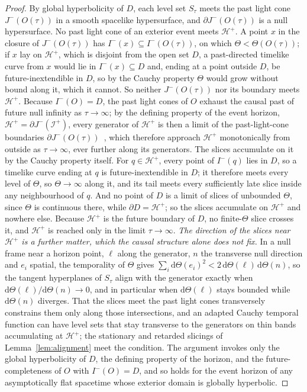 \documentclass[11pt,a4paper]{article}
\theoremstyle{plain}
\theoremstyle{remark}
\begin{document}
\begin{proof}
By global hyperbolicity of $D$, each level set $S_\tau$ meets the past light cone $J^-(O(\tau))$ in a smooth spacelike hypersurface, and $\partial J^-(O(\tau))$ is a null hypersurface. No past light cone of an exterior event meets $\mathcal{H}^+$. A point $x$ in the closure of $J^-(O(\tau))$ has $I^-(x)\subseteq I^-(O(\tau))$, on which $\Theta<\Theta(O(\tau))$; if $x$ lay on $\mathcal{H}^+$, which is disjoint from the open set $D$, a past-directed timelike curve from $x$ would lie in $I^-(x)\subseteq D$ and, ending at a point outside $D$, be future-inextendible in $D$, so by the Cauchy property $\Theta$ would grow without bound along it, which it cannot. So neither $J^-(O(\tau))$ nor its boundary meets $\mathcal{H}^+$. Because $I^-(O)=D$, the past light cones of $O$ exhaust the causal past of future null infinity as $\tau\to\infty$; by the defining property of the event horizon, $\mathcal{H}^+=\partial J^-(\mathscr{I}^+)$, every generator of $\mathcal{H}^+$ is then a limit of the past-light-cone boundaries $\partial J^-(O(\tau))$~\cite{hawking1971,Wald1984}, which therefore approach $\mathcal{H}^+$ monotonically from outside as $\tau\to\infty$, ever further along its generators. The slices accumulate on it by the Cauchy property itself. For $q\in\mathcal{H}^+$, every point of $I^-(q)$ lies in $D$, so a timelike curve ending at $q$ is future-inextendible in $D$; it therefore meets every level of $\Theta$, so $\Theta\to\infty$ along it, and its tail meets every sufficiently late slice inside any neighbourhood of $q$. And no point of $D$ is a limit of slices of unbounded $\Theta$, since $\Theta$ is continuous there, while $\partial D=\mathcal{H}^+$; so the slices accumulate on $\mathcal{H}^+$ and nowhere else. Because $\mathcal{H}^+$ is the future boundary of $D$, no finite-$\Theta$ slice crosses it, and $\mathcal{H}^+$ is reached only in the limit $\tau\to\infty$. \emph{The direction of the slices near $\mathcal{H}^+$ is a further matter, which the causal structure alone does not fix.} In a null frame near a horizon point, $\ell$ along the generator, $n$ the transverse null direction and $e_i$ spatial, the temporality of $\Theta$ gives $\sum_i \mathrm{d}\Theta(e_i)^2<2\,\mathrm{d}\Theta(\ell)\,\mathrm{d}\Theta(n)$, so the tangent hyperplanes of $S_\tau$ align with the generator exactly when $\mathrm{d}\Theta(\ell)/\mathrm{d}\Theta(n)\to0$, and in particular when $\mathrm{d}\Theta(\ell)$ stays bounded while $\mathrm{d}\Theta(n)$ diverges. That the slices meet the past light cones transversely constrains them only along those intersections, and an adapted Cauchy temporal function can have level sets that stay transverse to the generators on thin bands accumulating at $\mathcal{H}^+$; the stationary and retarded slicings of Lemma~\ref{lem:alignment} meet the condition. The argument invokes only the global hyperbolicity of $D$, the defining property of the horizon, and the future-completeness of $O$ with $I^-(O)=D$, and so holds for the event horizon of any asymptotically flat spacetime whose exterior domain is globally hyperbolic.
\end{proof}
\end{document}
